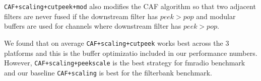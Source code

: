 \texttt{CAF+scaling+cutpeek+mod} also modifies the CAF algorithm so 
that two adjacent filters are never fused if the downstream filter has 
$peek>pop$ and modular buffers are used for channels 
where downstream filter has $peek>pop$.

We found that on average \texttt{CAF+scaling+cutpeek} works best across 
the 3 platforms and this is the buffer optimizatio included in our 
performance numbers. However, \texttt{CAF+scaling+peekscale} is the 
best strategy for fmradio benchmark and our baseline \texttt{CAF+scaling} 
is best for the filterbank benchmark.











